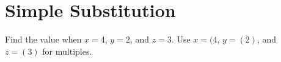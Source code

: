 
\section*{Simple Substitution}

\question Find the value when \( x = 4 \), \( y = 2 \), and \( z = 3 \).  Use \( x = (4 \), \( y = (2) \), and \( z =( 3 )\) for multiples.

\begin{multicols}{2}
\end{multicols} \ms
\newpage

